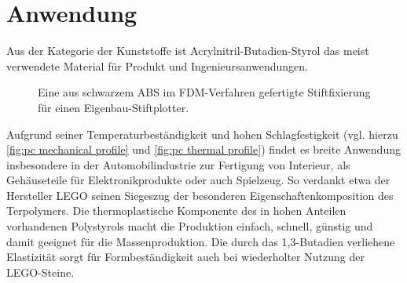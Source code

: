     \section{Anwendung}\label{sec:anwendung}
            Aus der Kategorie der Kunststoffe ist Acrylnitril-Butadien-Styrol das meist verwendete Material für Produkt und
            Ingenieursanwendungen.\par
            \begin{figure}
                \centering
                \vspace{-\baselineskip}
                \caption[Eine aus schwarzem ABS im FDM-Verfahren gefertigte Stiftfixierung]{Eine aus schwarzem ABS im FDM-Verfahren gefertigte Stiftfixierung für einen Eigenbau-Stiftplotter.}%
                \label{fig:3dDruck ABS teil}
            \end{figure}
            Aufgrund seiner Temperaturbeständigkeit und hohen Schlagfestigkeit (vgl. hierzu \cref{fig:pc mechanical profile} und \cref{fig:pc thermal profile}) findet es breite Anwendung insbesondere in der
            Automobilindustrie zur Fertigung von Interieur, als Gehäuseteile für Elektronikprodukte oder auch Spielzeug. So verdankt etwa der Hersteller
            \textsc{LEGO} seinen Siegeszug der besonderen Eigenschaftenkomposition des Terpolymers. Die thermoplastische Komponente
            des in hohen Anteilen vorhandenen Polystyrols macht die Produktion einfach, schnell, günstig und damit geeignet
            für die Massenproduktion. Die durch das 1,3-Butadien verliehene Elastizität sorgt für Formbeständigkeit auch bei
            wiederholter Nutzung der \textsc{LEGO}-Steine.


